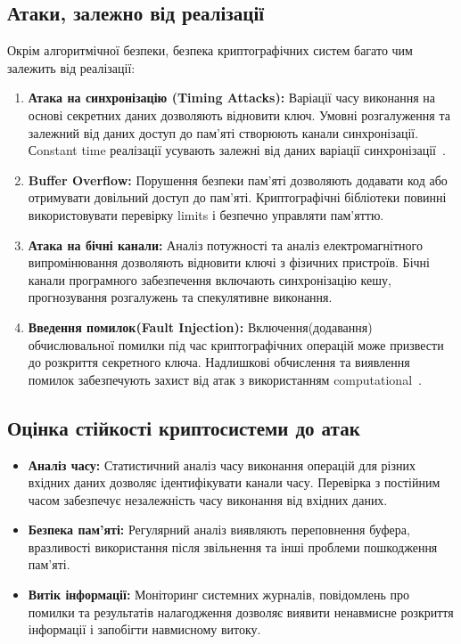 \subsection{Атаки, залежно від реалізації}

Окрім алгоритмічної безпеки, безпека криптографічних систем багато чим залежить від реалізації:

\begin{enumerate}
    \item \textbf{Атака на синхронізацію (Timing Attacks):} Варіації часу виконання на основі секретних даних дозволяють 
        відновити ключ. Умовні розгалуження та залежний від даних доступ до пам'яті створюють канали синхронізації. 
        Сonstant time реалізації усувають залежні від даних варіації синхронізації~\cite{kocher1996}.
    \item \textbf{Buffer Overflow:} Порушення безпеки пам'яті дозволяють додавати код або отримувати довільний доступ 
        до пам'яті. Криптографічні бібліотеки повинні використовувати перевірку limits і безпечно управляти пам'яттю.
    \item \textbf{Атака на бічні канали:} Аналіз потужності та аналіз електромагнітного випромінювання дозволяють 
        відновити ключі з фізичних пристроїв. Бічні канали програмного забезпечення включають синхронізацію кешу, 
        прогнозування розгалужень та спекулятивне виконання.
    \item \textbf{Введення помилок(Fault Injection):} Включення(додавання) обчислювальної помилки під час криптографічних 
        операцій може призвести до розкриття секретного ключа. Надлишкові обчислення та виявлення помилок забезпечують 
        захист від атак з використанням computational~\cite{boneh1997}.
\end{enumerate}

\subsection{Оцінка стійкості криптосистеми до атак}

\begin{itemize}
    \item \textbf{Аналіз часу:} Статистичний аналіз часу виконання операцій для різних вхідних даних дозволяє 
        ідентифікувати канали часу. Перевірка з постійним часом забезпечує незалежність часу виконання від 
        вхідних даних.
    \item \textbf{Безпека пам'яті:} Регулярний аналіз виявляють переповнення буфера, вразливості використання після
        звільнення та інші проблеми пошкодження пам'яті.
    \item \textbf{Витік інформації:} Моніторинг системних журналів, повідомлень про помилки та результатів налагодження
        дозволяє виявити ненавмисне розкриття інформації і запобігти навмисному витоку.
\end{itemize}

